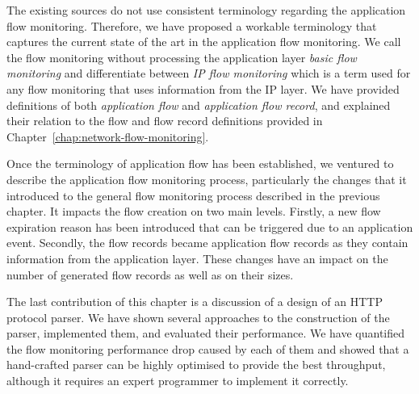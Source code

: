 The existing sources do not use consistent terminology regarding the application flow monitoring. Therefore, we have proposed a workable terminology that captures the current state of the art in the application flow monitoring. We call the flow monitoring without processing the application layer \emph{basic flow monitoring} and differentiate between \emph{IP flow monitoring} which is a term used for any flow monitoring that uses information from the IP layer. We have provided definitions of both \emph{application flow} and \emph{application flow record}, and explained their relation to the flow and flow record definitions provided in Chapter~\ref{chap:network-flow-monitoring}.

Once the terminology of application flow has been established, we ventured to describe the application flow monitoring process, particularly the changes that it introduced to the general flow monitoring process described in the previous chapter. It impacts the flow creation on two main levels. Firstly, a new flow expiration reason has been introduced that can be triggered due to an application event. Secondly, the flow records became application flow records as they contain information from the application layer. These changes have an impact on the number of generated flow records as well as on their sizes.

The last contribution of this chapter is a discussion of a design of an HTTP protocol parser. We have shown several approaches to the construction of the parser, implemented them, and evaluated their performance. We have quantified the flow monitoring performance drop caused by each of them and showed that a hand-crafted parser can be highly optimised to provide the best throughput, although it requires an expert programmer to implement it correctly.